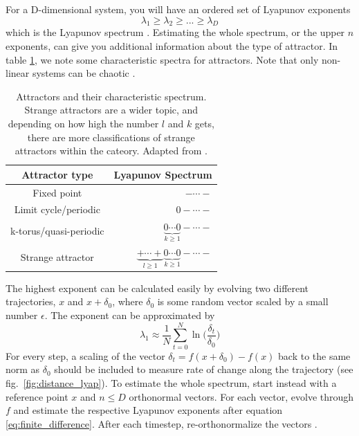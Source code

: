 \documentclass[letterpaper]{article}
\begin{document}
\enlargethispage*{2em}
For a D-dimensional system, you will have an ordered set of Lyapunov exponents
$$\lambda_1 \geq \lambda_2 \geq ... \geq \lambda_D$$
which is the Lyapunov spectrum \citep[p.\ 41]{datseris2022nonlinear}. Estimating the whole spectrum, or the upper $n$ exponents, can give you additional information about the type of attractor. In table \ref{tab:spectrum}, we note some characteristic spectra for attractors. Note that only non-linear systems can be chaotic \citep[p.\ 44]{datseris2022nonlinear}.

\begin{table}[ht]
    \centering
    \begin{tabular}{c|r}
        Attractor type & Lyapunov Spectrum \\
        \hline
        Fixed point & $- \cdots -$ \\
        Limit cycle/periodic & $0 - \cdots -$ \\
        k-torus/quasi-periodic & $\underbrace{0 \cdots 0}_{k \geq 1} - \cdots -$ \\
        Strange attractor & $\underbrace{+ \cdots +}_{l \geq 1} \underbrace{0 \cdots 0}_{k \geq 1} - \cdots -$ \\
    \end{tabular}
    \caption{Attractors and their characteristic spectrum. Strange attractors are a wider topic, and depending on how high the number $l$ and $k$ gets, there are more classifications of strange attractors within the cateory. Adapted from \citep{sandri1996numerical}.}
    \label{tab:spectrum}
\end{table}

The highest exponent can be calculated easily by evolving two different trajectories, $x$ and $x + \delta_0$, where $\delta_0$ is some random vector scaled by a small number $\epsilon$. The exponent can be approximated by 
\begin{equation}
    \lambda_1 \approx \frac{1}{N} \sum_{t = 0}^N \ln{\bigg(\frac{\delta_t}{\delta_0}\bigg)}
    \label{eq:finite_difference}
\end{equation}
For every step, a scaling of the vector $\delta_t = f(x + \delta_0) - f(x) $ back to the same norm as $\delta_0$ should be included to measure rate of change along the trajectory (see fig.\ \ref{fig:distance_lyap}). To estimate the whole spectrum, start instead with a reference point $x$ and $n \leq D$ orthonormal vectors. For each vector, evolve through $f$ and estimate the respective Lyapunov exponents after equation \ref{eq:finite_difference}. After each timestep, re-orthonormalize the vectors \citep[p. 211]{datseris2022nonlinear}. 
\end{document}
